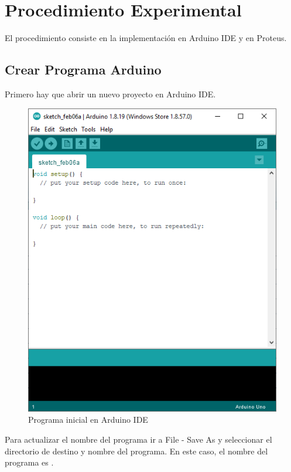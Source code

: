 \documentclass{article}
\begin{document}
    \section{Procedimiento Experimental}

    El procedimiento consiste en la implementación en Arduino IDE y en Proteus.

    \subsection{Crear Programa Arduino}

    Primero hay que abrir un nuevo proyecto en Arduino IDE.

    \begin{figure}[H]
        \centering
        \includegraphics[width=0.3\paperwidth]{images/arduino-1}
        \caption{Programa inicial en Arduino IDE}
    \end{figure}

    Para actualizar el nombre del programa ir a File - Save As y seleccionar
    el directorio de destino y nombre del programa. En este caso, el nombre
    del programa es .
\end{document}
